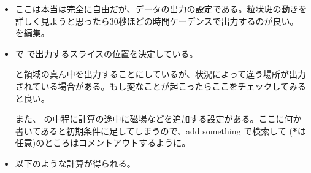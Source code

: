\documentclass[letterpaper,10pt,dvipdfmx,report]{sphinxmanual}
\let\sphinxpxdimen\pdfpxdimen\else\newdimen\sphinxpxdimen
\begin{document}
\begin{itemize}
\item {} \begin{description}
\sphinxAtStartPar
ここは本当は完全に自由だが、データの出力の設定である。粒状斑の動きを詳しく見ようと思ったら30秒ほどの時間ケーデンスで出力するのが良い。
 を編集。

\begin{sphinxVerbatim}[commandchars=\\\{\}]
\end{sphinxVerbatim}

\end{description}

\item {} \begin{description}
\sphinxAtStartPar
{} で  で出力するスライスの位置を決定している。

\begin{sphinxVerbatim}[commandchars=\\\{\}]
\end{sphinxVerbatim}

\sphinxAtStartPar
と領域の真ん中を出力することにしているが、状況によって違う場所が出力されている場合がある。もし変なことが起こったらここをチェックしてみると良い。

\sphinxAtStartPar
また、  の中程に計算の途中に磁場などを追加する設定がある。ここに何か書いてあると初期条件に足してしまうので、add something で検索して  ({\color{red}\bfseries{}*}は任意)のところはコメントアウトするように。

\end{description}

\item {} \begin{description}
\sphinxAtStartPar
以下のような計算が得られる。

\noindent\sphinxincludegraphics[width=500\sphinxpxdimen]{{photosphere}.png}

\end{description}

\end{itemize}
\end{document}
